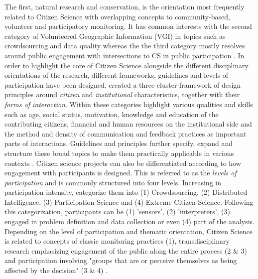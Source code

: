 {The first, natural research and conservation, is the orientation most frequently related to Citizen Science with overlapping concepts to community-based, volunteer and participatory monitoring. It has common interests with the second category of Volunteered Geographic Information (VGI) in topics such as crowdsourcing and data quality whereas the the third category mostly resolves around public engagement with intersections to CS in public participation \autocite{kullenbergWhatCitizenScience2016}. In order to highlight the core of Citizen Science alongside the different disciplinary orientations of the research, different frameworks, guidelines and levels of participation have been designed.\autocite{kirschkeCitizenScienceProjects2022} created a three cluster framework of design principles around \textit{citizen} and \textit{institutional} characteristics, together with their \textit{forms of interaction}. Within these categories \autocite{kirschkeCitizenScienceProjects2022} highlight various qualities and skills such as age, social status, motivation, knowledge and education of the contributing citizens, financial and human resources on the institutional side and the method and density of communication and feedback practices as important parts of interactions. Guidelines and principles further specify, expand and structure these broad topics to make them practically applicable in various contexts \autocite{citizenscience.govBasicStepsYour,escaTenPrinciplesCitizen2015,escaECSACharacteristicsCitizen2020,EUCitizenScience2023,fraislCitizenScienceEnvironmental2022,garciaFindingWhatYou2021,minkmanCitizenScienceWater2015,pocockStrategicFrameworkSupport,skarlatidouWhatVolunteersWant2019}. Citizen science projects can also be differentiated according to how engagement with participants is designed. This is referred to as the \textit{levels of participation} and is commonly structured into four levels. Increasing in participation intensity, \autocite{buckinghamshumGlobalParticipatoryPlatform2012} categorize them into (1) Crowdsourcing, (2) Distributed Intelligence, (3) Participation Science and (4) Extreme Citizen Science. Following this categorization, participants can be (1) 'sensors', (2) 'interpreters', (3) engaged in problem definition and data collection or even (4) part of the analysis. 
Depending on the level of participation and thematic orientation, Citizen Science is related to concepts of classic monitoring practices (1), transdisciplinary research emphasizing engagement of the public along the entire process (2 & 3) and participation involving "groups that are or perceive themselves as being affected by the decision" (3 & 4) \autocites{buckinghamshumGlobalParticipatoryPlatform2012}{conradReviewCitizenScience2011}{minkmanCitizenScienceWater2015}[1]{rennParticipatoryProcessesDesigning2006}. 
}
